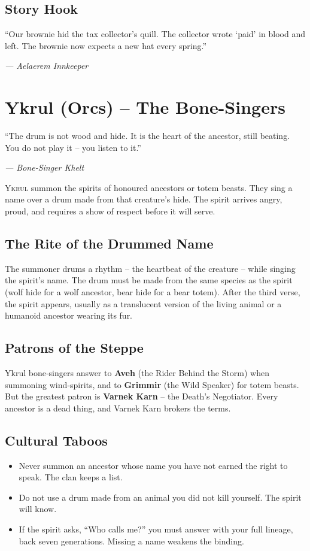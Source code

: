 \documentclass[10pt,a5paper]{book}
\begin{document}
\subsection*{Story Hook}
\epigraph{“Our brownie hid the tax collector’s quill. The collector wrote ‘paid’ in blood and left. The brownie now expects a new hat every spring.”}{\textit{— Aelaerem Innkeeper}}

\clearpage

\section{Ykrul (Orcs) – The Bone-Singers}
\epigraph{“The drum is not wood and hide. It is the heart of the ancestor, still beating. You do not play it – you listen to it.”}{\textit{— Bone-Singer Khelt}}

\lettrine{Y}{krul} summon the spirits of honoured ancestors or totem beasts. They sing a name over a drum made from that creature’s hide. The spirit arrives angry, proud, and requires a show of respect before it will serve.

\subsection*{The Rite of the Drummed Name}
The summoner drums a rhythm – the heartbeat of the creature – while singing the spirit’s name. The drum must be made from the same species as the spirit (wolf hide for a wolf ancestor, bear hide for a bear totem). After the third verse, the spirit appears, usually as a translucent version of the living animal or a humanoid ancestor wearing its fur.

\subsection*{Patrons of the Steppe}
Ykrul bone‑singers answer to \textbf{Aveh} (the Rider Behind the Storm) when summoning wind‑spirits, and to \textbf{Grimmir} (the Wild Speaker) for totem beasts. But the greatest patron is \textbf{Varnek Karn} – the Death’s Negotiator. Every ancestor is a dead thing, and Varnek Karn brokers the terms.

\subsection*{Cultural Taboos}
\begin{itemize}
    \item Never summon an ancestor whose name you have not earned the right to speak. The clan keeps a list.
    \item Do not use a drum made from an animal you did not kill yourself. The spirit will know.
    \item If the spirit asks, “Who calls me?” you must answer with your full lineage, back seven generations. Missing a name weakens the binding.
\end{itemize}
\end{document}
